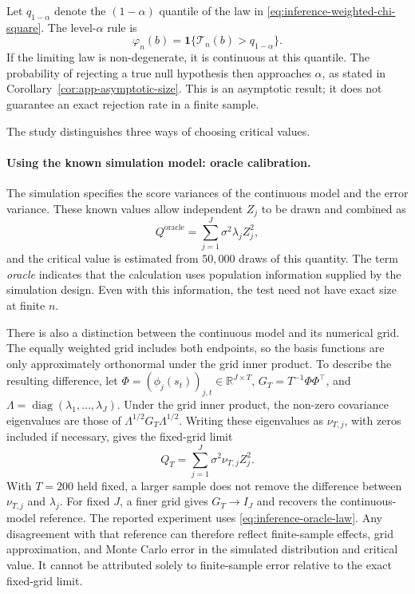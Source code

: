 Let $q_{1-\alpha}$ denote the $(1-\alpha)$ quantile of the law in
\eqref{eq:inference-weighted-chi-square}.  The level-$\alpha$ rule is
\begin{equation}
    \varphi_n(b)
    =\mathbf 1\{\mathcal T_n(b)>q_{1-\alpha}\}.
    \label{eq:inference-rejection-rule}
\end{equation}
If the limiting law is non-degenerate, it is continuous at this quantile.
The probability of rejecting a true null hypothesis then approaches
$\alpha$, as stated in Corollary~\ref{cor:app-asymptotic-size}.  This is an
asymptotic result; it does not guarantee an exact rejection rate in a finite
sample.

The study distinguishes three ways of choosing critical values.

\paragraph{Using the known simulation model: oracle calibration.}
The simulation specifies the score variances of the continuous model and
the error variance.  These known values allow independent $Z_j$ to be drawn
and combined as
\begin{equation}
    Q^{\mathrm{oracle}}
    =\sum_{j=1}^{J}\sigma^2\lambda_jZ_j^2,
    \label{eq:inference-oracle-law}
\end{equation}
and the critical value is estimated from $50{,}000$ draws of this quantity.
The term \emph{oracle} indicates that the calculation uses population
information supplied by the simulation design.  Even with this information,
the test need not have exact size at finite $n$.

There is also a distinction between the continuous model and its numerical
grid.  The equally weighted grid includes both endpoints, so the basis
functions are only approximately orthonormal under the grid inner product.
To describe the resulting difference, let
$\Phi=(\phi_j(s_t))_{j,t}\in\mathbb R^{J\times T}$,
$G_T=T^{-1}\Phi\Phi^\top$, and
$\Lambda=\operatorname{diag}(\lambda_1,\ldots,\lambda_J)$.
Under the grid inner product, the non-zero covariance eigenvalues are those
of $\Lambda^{1/2}G_T\Lambda^{1/2}$.  Writing these eigenvalues as
$\nu_{T,j}$, with zeros included if necessary, gives the fixed-grid limit
\begin{equation}
    Q_T=\sum_{j=1}^{J}\sigma^2\nu_{T,j}Z_j^2.
    \label{eq:inference-grid-oracle-law}
\end{equation}
With $T=200$ held fixed, a larger sample does not remove the difference
between $\nu_{T,j}$ and $\lambda_j$.  For fixed $J$, a finer grid gives
$G_T\to I_J$ and recovers the continuous-model reference.  The reported
experiment uses \eqref{eq:inference-oracle-law}.  Any disagreement with that
reference can therefore reflect finite-sample effects, grid approximation,
and Monte Carlo error in the simulated distribution and critical value.
It cannot be attributed solely to finite-sample error relative to the exact
fixed-grid limit.

